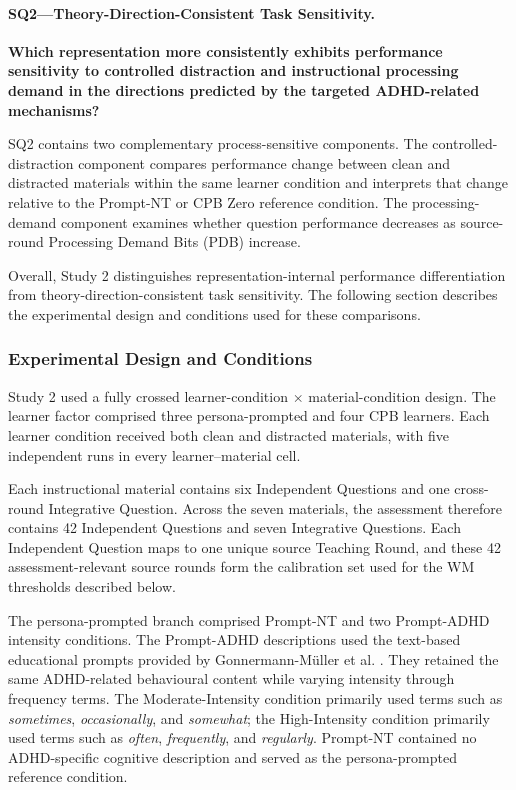\paragraph{SQ2---Theory-Direction-Consistent Task Sensitivity.}

{\small
\textbf{Which representation more consistently exhibits performance sensitivity to controlled distraction and instructional processing demand in the directions predicted by the targeted ADHD-related mechanisms?}
\par}

SQ2 contains two complementary process-sensitive components. The controlled-distraction component compares performance change between clean and distracted materials within the same learner condition and interprets that change relative to the Prompt-NT or CPB Zero reference condition. The processing-demand component examines whether question performance decreases as source-round Processing Demand Bits (PDB) increase.

Overall, Study 2 distinguishes representation-internal performance differentiation from theory-direction-consistent task sensitivity. The following section describes the experimental design and conditions used for these comparisons.

\subsubsection{Experimental Design and Conditions}
\label{subsubsec:study2-conditions}

Study 2 used a fully crossed learner-condition $\times$ material-condition design. The learner factor comprised three persona-prompted and four CPB learners. Each learner condition received both clean and distracted materials, with five independent runs in every learner--material cell.

Each instructional material contains six Independent Questions and one cross-round Integrative Question. Across the seven materials, the assessment therefore contains 42 Independent Questions and seven Integrative Questions. Each Independent Question maps to one unique source Teaching Round, and these 42 assessment-relevant source rounds form the calibration set used for the WM thresholds described below.

The persona-prompted branch comprised Prompt-NT and two Prompt-ADHD intensity conditions. The Prompt-ADHD descriptions used the text-based educational prompts provided by Gonnermann-Müller et al. \cite{gonnermann-muller-etal-2026-adhd-persona}. They retained the same ADHD-related behavioural content while varying intensity through frequency terms. The Moderate-Intensity condition primarily used terms such as \textit{sometimes}, \textit{occasionally}, and \textit{somewhat}; the High-Intensity condition primarily used terms such as \textit{often}, \textit{frequently}, and \textit{regularly}. Prompt-NT contained no ADHD-specific cognitive description and served as the persona-prompted reference condition.

